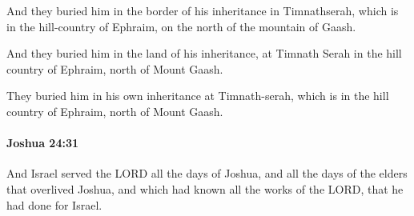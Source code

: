 			\begin{versebox}
					\item[BHS] 
					\item[ASV] And they buried him in the border of his inheritance in Timnathserah, which is in the hill-country of Ephraim, on the north of the mountain of Gaash.
					\item[NIV] And they buried him in the land of his inheritance, at Timnath Serah in the hill country of Ephraim, north of Mount Gaash.
					\item[NRSV] They buried him in his own inheritance at Timnath-serah, which is in the hill country of Ephraim, north of Mount Gaash.
			\end{versebox}

		\paragraph{Joshua 24:31} %
			\label{JOSHUA-24-31}

			And Israel served the LORD all the days of Joshua, and all the days of the elders that overlived Joshua, and which had known all the works of the LORD, that he had done for Israel.

